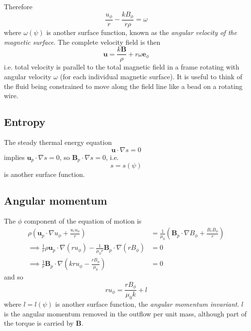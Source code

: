 \documentclass{jknotes}
\newcommand{\B}{\symbf{B}}
\renewcommand{\u}{\symbf{u}}
\begin{document}
Therefore
\begin{equation}
	\frac{u_\phi}{r} - \frac{kB_\phi}{r\rho} = \omega
\end{equation}
where $\omega(\psi)$ is another surface function, known as the \emph{angular
velocity of the magnetic surface}. The complete velocity field is then
\begin{equation}
	\u = \frac{k\B}{\rho} + r\omega \symbf{e}_\phi
\end{equation}
i.e. total velocity is parallel to the total magnetic field in a frame
rotating with angular velocity $\omega$ (for each individual magnetic
surface). It is useful to think of the fluid being constrained to move along
the field line like a bead on a rotating wire.

\subsection{Entropy}
The steady thermal energy equation
\begin{equation}
	\u \cdot \nabla s = 0
\end{equation}
implies $\u_p \cdot \nabla s = 0$, so $\B_p \cdot \nabla s = 0$, i.e.
\begin{equation}
	s= s(\psi)
\end{equation}
is another surface function.

\subsection{Angular momentum}
The $\phi$ component of the equation of motion is
\begin{align}
	\rho\left( \u_p \cdot \nabla u_\phi + \frac{u_r u_\phi}{r}\right) &=
	\frac{1}{\mu_0}\left(\B_p \cdot \nabla B_\phi + \frac{B_r
	B_\phi}{r}\right) \\
	\implies \frac{1}{r}\rho \u_p \cdot \nabla(ru_\phi) - \frac{1}{\mu_0 r}
	\B_p \cdot \nabla(rB_\phi) &= 0 \\
	\implies \frac{1}{r}\B_p \cdot \nabla \left( kr u_\phi -
	\frac{rB_\phi}{\mu_0}\right) &= 0
\end{align}
and so
\begin{equation}
	ru_\phi = \frac{r B_\phi}{\mu_0 k} + l
\end{equation}
where $l = l(\psi)$ is another surface function, the \emph{angular momentum
invariant}. $l$ is the angular momentum removed in the outflow per unit mass,
although part of the torque is carried by $\B$.
\end{document}

